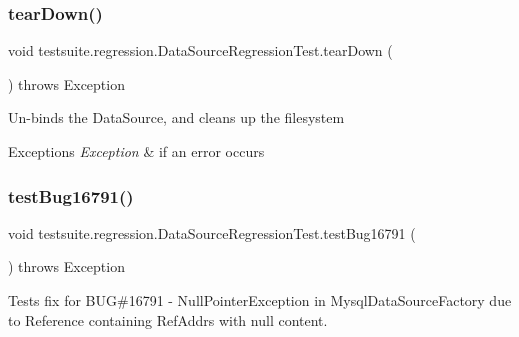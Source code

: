 \subsubsection{\texorpdfstring{tear\+Down()}{tearDown()}}
{\footnotesize\ttfamily void testsuite.\+regression.\+Data\+Source\+Regression\+Test.\+tear\+Down (\begin{DoxyParamCaption}{ }\end{DoxyParamCaption}) throws Exception}

Un-\/binds the Data\+Source, and cleans up the filesystem


\begin{DoxyExceptions}{Exceptions}
{\em Exception} & if an error occurs \\
\hline
\end{DoxyExceptions}
\mbox{\label{classtestsuite_1_1regression_1_1_data_source_regression_test_af69d51f59966174507009b456bcc4ef3}} 
\subsubsection{\texorpdfstring{test\+Bug16791()}{testBug16791()}}
{\footnotesize\ttfamily void testsuite.\+regression.\+Data\+Source\+Regression\+Test.\+test\+Bug16791 (\begin{DoxyParamCaption}{ }\end{DoxyParamCaption}) throws Exception}

Tests fix for B\+UG\#16791 -\/ Null\+Pointer\+Exception in Mysql\+Data\+Source\+Factory due to Reference containing Ref\+Addrs with null content.


